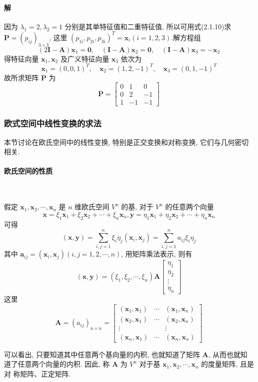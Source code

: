 \paragraph*{解} 因为 $\lambda_1 = 2, \lambda_2 = 1$ 分别是其单特征值和二重特征值, 所以可用式(2.1.10)求 $\bm{P} =
    (p_{ij})_{3\times 3}$, 这里 $(p_{1i},p_{2i},p_{3i})^T = \bm{x}_i(i = 1, 2, 3)$.解方程组
$$
    (2\bm{I} - \bm{A})\bm{x}_1 = \bm{0},\quad (\bm{I} - \bm{A})\bm{x}_2 = \bm{0}, \quad (\bm{I} - \bm{A})\bm{x}_3 = -\bm{x}_2
$$
得特征向量 $\bm{x}_1, \bm{x}_2$ 及广义特征向量 $\bm{x}_3$ 依次为
$$
    \bm{x}_1 = (0, 0, 1)^T,\quad \bm{x}_2 = (1, 2, -1)^T, \quad \bm{x}_3 = (0, 1, -1)^T
$$
故所求矩阵 $\bm{P}$ 为
$$
    \bm{P} = \begin{bmatrix}
        0 & 1  & 0  \\
        0 & 2  & -1 \\
        1 & -1 & -1
    \end{bmatrix}
$$


\subsubsection{欧式空间中线性变换的求法}

本节讨论在欧氏空间中的线性变换, 特别是正交变换和对称变换, 它们与几何密切
相关.

\paragraph[]{欧氏空间的性质} \

\par 假定 $\bm{x}_1, \bm{x}_2, \cdots, \bm{x}_n$ 是 $n$ 维欧氏空间 $V^n$ 的基, 对于 $V^n$ 的任意两个向量
$$
    \bm{x} = \xi_1\bm{x}_1 + \xi_2\bm{x}_2 + \cdots + \xi_n\bm{x}_n, \bm{y} = \eta_1\bm{x}_1 + \eta_2\bm{x}_2 + \cdots + \eta_n\bm{x}_n
$$
可得
$$
    (\bm{x}, \bm{y}) = \sum\limits_{i,j=1}^{n} \xi_i\eta_j(\bm{x}_i, \bm{x}_j) = \sum\limits_{i, j=1}^{n} a_{ij}\xi_i\eta_j
$$
其中 $\bm{a}_{ij} = (\bm{x}_i, \bm{x}_j)(i,j = 1,2,\cdots, n)$, 用矩阵乘法表示, 则有
$$
    (\bm{x}, \bm{y}) = (\xi_1, \xi_2, \cdots, \xi_n)\bm{A}\begin{bmatrix}
        \eta_1 \\
        \eta_2 \\
        \vdots \\
        \eta_n
    \end{bmatrix}
$$
这里
$$
    \bm{A} = (a_{ij})_{n\times n} = \begin{bmatrix}
        (\bm{x}_1, \bm{x}_1) & \cdots & (\bm{x}_1, \bm{x}_n) \\
        (\bm{x}_2, \bm{x}_1) & \cdots & (\bm{x}_2, \bm{x}_n) \\
        \vdots               &        & \vdots               \\
        (\bm{x}_n, \bm{x}_1) & \cdots & (\bm{x}_n, \bm{x}_n)
    \end{bmatrix}
$$
\par 可以看出, 只要知道其中任意两个基向量的内积, 也就知道了矩阵 $\bm{A}$, 从而也就知
道了任意两个向量的内积. 因此, 称 $\bm{A}$ 为 $V^n$ 对于基 $\bm{x}_1, \bm{x}_2, \cdots, \bm{x}_n$ 的度量矩阵, 且是对
称矩阵、正定矩阵.

